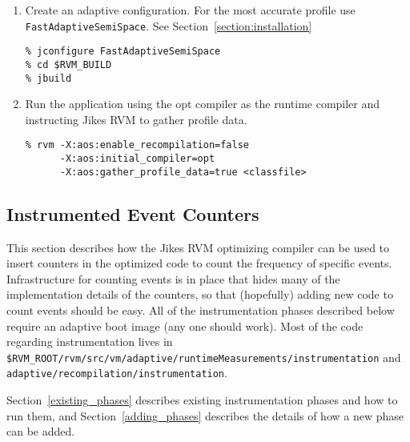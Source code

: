 \begin{enumerate}
\item Create an adaptive configuration.  For the most accurate profile use
{\tt FastAdaptiveSemiSpace}.  See Section~\ref{section:installation}
\begin{verbatim}
% jconfigure FastAdaptiveSemiSpace
% cd $RVM_BUILD
% jbuild
\end{verbatim}

\item Run the application using the opt compiler as the runtime compiler and
instructing Jikes RVM to gather profile data.
\begin{verbatim}
% rvm -X:aos:enable_recompilation=false 
      -X:aos:initial_compiler=opt 
      -X:aos:gather_profile_data=true <classfile>
\end{verbatim}
\end{enumerate}

\subsection{Instrumented Event Counters}
\label{counting_events}
This section describes how the Jikes RVM optimizing compiler
can be used to 
insert counters in the optimized code to count the frequency of
specific events.  Infrastructure for counting events is in place that
hides many of the implementation details of the counters, so that
(hopefully) adding new code to count events should be easy.  All of
the instrumentation phases described below require an adaptive boot
image (any one should work).  Most of the code regarding
instrumentation lives in {\tt
\$RVM\_ROOT/rvm/src/vm/adaptive/runtimeMeasurements/instrumentation} and {\tt
adaptive/recompilation/instrumentation}.

Section~\ref{existing_phases} describes existing instrumentation
phases and how to run them, and Section~\ref{adding_phases}
describes the details of how a new phase can be added.

